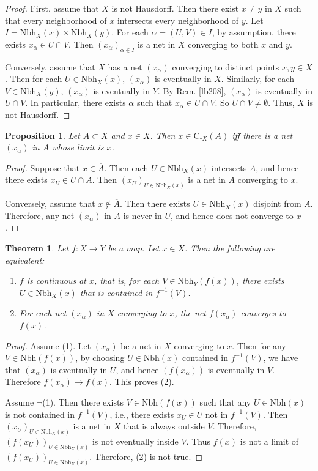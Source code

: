 \documentclass[12pt,b5paper,notitlepage]{article}
\theoremstyle{definition}
\theoremstyle{plain}
\newtheorem{thm}[df]{Theorem}
\newtheorem{pp}[df]{Proposition}
\newcommand{\ovl}{\overline}
\newcommand{\Nbh}{\mathrm{Nbh}}
\newcommand{\Cl}{\mathrm{Cl}}
\numberwithin{equation}{section}
\begin{document}
\begin{proof}
First, assume that $X$ is not Hausdorff. Then there exist $x\neq y$ in $X$ such that every neighborhood of $x$ intersects every neighborhood of $y$. Let $I=\Nbh_X(x)\times\Nbh_X(y)$. For each $\alpha=(U,V)\in I$, by assumption, there exists $x_\alpha\in U\cap V$. Then $(x_\alpha)_{\alpha\in I}$ is a net in $X$ converging to both $x$ and $y$.

Conversely, assume that $X$ has a net $(x_\alpha)$ converging to distinct points $x,y\in X$. Then for each $U\in\Nbh_X(x)$, $(x_\alpha)$ is eventually in $X$. Similarly, for each $V\in\Nbh_X(y)$, $(x_\alpha)$ is eventually in $Y$. By Rem. \ref{lb208}, $(x_\alpha)$ is eventually in $U\cap V$. In particular, there exists $\alpha$ such that $x_\alpha\in U\cap V$. So $U\cap V\neq\emptyset$. Thus, $X$ is not Hausdorff.
\end{proof}


\begin{pp}\label{lb209}
Let $A\subset X$ and $x\in X$. Then $x\in\Cl_X(A)$ iff there is a net $(x_\alpha)$ in $A$ whose limit is $x$.
\end{pp}


\begin{proof}
Suppose that $x\in\ovl A$. Then each $U\in\Nbh_X(x)$ intersects $A$, and hence there exists $x_U\in U\cap A$. Then $(x_U)_{U\in\Nbh_X(x)}$ is a net in $A$ converging to $x$.

Conversely, assume that $x\notin\ovl A$. Then there exists $U\in\Nbh_X(x)$ disjoint from $A$. Therefore, any net $(x_\alpha)$ in $A$ is never in $U$, and hence does not converge to $x$.
\end{proof}


\begin{thm}\label{lb210}
Let $f:X\rightarrow Y$ be a map. Let $x\in X$. Then the following are equivalent:
\begin{enumerate}
\item[(1)] $f$ is continuous at $x$, that is, for each $V\in\Nbh_Y(f(x))$, there exists $U\in\Nbh_X(x)$ that is contained in $f^{-1}(V)$.
\item[(2)] For each net $(x_\alpha)$ in $X$ converging to $x$, the net $f(x_\alpha)$ converges to $f(x)$.
\end{enumerate}
\end{thm}


\begin{proof}
Assume (1). Let $(x_\alpha)$ be a net in $X$ converging to $x$. Then for any $V\in\Nbh(f(x))$, by choosing $U\in\Nbh(x)$ contained in $f^{-1}(V)$, we have that $(x_\alpha)$ is eventually in $U$, and hence $(f(x_\alpha))$ is eventually in $V$. Therefore $f(x_\alpha)\rightarrow f(x)$. This proves (2).

Assume $\neg$(1). Then there exists $V\in\Nbh(f(x))$ such that any $U\in\Nbh(x)$ is not contained in $f^{-1}(V)$, i.e., there exists $x_U\in U$ not in $f^{-1}(V)$. Then $(x_U)_{U\in\Nbh_X(x)}$ is a net in $X$ that is always outside $V$. Therefore, $(f(x_U))_{U\in\Nbh_X(x)}$ is not eventually inside $V$. Thus $f(x)$ is not a limit of $(f(x_U))_{U\in\Nbh_X(x)}$. Therefore, (2) is not true.
\end{proof}
\end{document}
